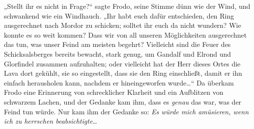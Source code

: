 „Stellt ihr es nicht in Frage?“ sagte Frodo, seine Stimme dünn wie der Wind, und schwankend wie ein Windhauch. „Ihr habt euch dafür entschieden, den Ring ausgerechnet nach Mordor zu schicken; solltet ihr euch da nicht wundern? Wie konnte es so weit kommen? Dass wir von all unseren Möglichkeiten ausgerechnet das tun, was unser Feind am meisten begehrt? Vielleicht sind die Feuer des Schicksalsberges bereits bewacht, stark genug, um Gandalf und Elrond und Glorfindel zusammen aufzuhalten; oder vielleicht hat der Herr dieses Ortes die Lava dort gekühlt, sie so eingestellt, dass sie den Ring einschließt, damit er ihn einfach herausholen kann, nachdem er hineingeworfen wurde…“ Da überkam Frodo eine Erinnerung von schrecklicher Klarheit und ein Aufblitzen von schwarzem Lachen, und der Gedanke kam ihm, dass es \emph{genau} das war, was der Feind tun würde. Nur kam ihm der Gedanke so: \emph{Es würde mich amüsieren, wenn ich zu herrschen beabsichtigte…}

